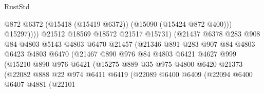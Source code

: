 \begin{lexlean}{RustStd}
\begin{coremodule}
                                        @872
                                        @6372
                                        (@15418 (@15419 @6372))
                                        (@15090 (@15424 @872 @400)))
                                      @15297))))
                              @21512
                              @18569
                              @18572
                              @21517
                              @15731)
                            (@21437
                              @6378
                              @283
                              @908
                              @84
                              @4803
                              @5143
                              @4803
                              @6470
                              @21457
                              (@21346
                                @891
                                @283
                                @907
                                @84
                                @4803
                                @6423
                                @4803
                                @6470
                                (@21467
                                  @890
                                  @976
                                  @84
                                  @4803
                                  @6421
                                  @4627
                                  @999
                                  (@15210
                                    @890
                                    @976
                                    @6421
                                    (@15275
                                      @889
                                      @35
                                      @975
                                      @4800
                                      @6420
                                      @21373
                                      (@22082
                                        @888
                                        @22
                                        @974
                                        @6411
                                        @6419
                                        (@22089
                                          @6400
                                          @6409
                                          (@22094
                                            @6400
                                            @6407
                                            @4881
                                            (@22101

\end{coremodule}
\end{lexlean}
